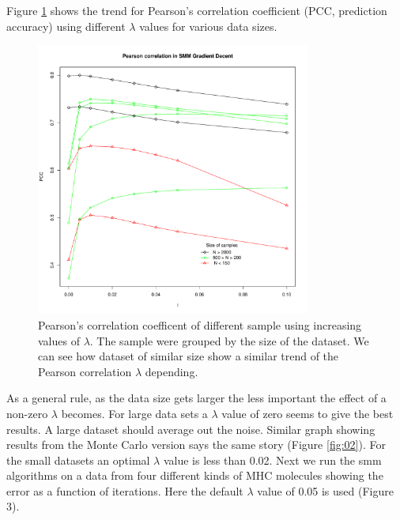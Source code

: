 \documentclass{bioinfo}
\begin{document}
\begin{application}
Figure \ref{fig:01} shows the trend for Pearson's correlation coefficient (PCC, prediction accuracy) using different $\lambda$ values for various data sizes.
\begin{figure}[!tpb]
\centerline{\includegraphics[width=9cm]{fig/smm_l005_ppc_size.pdf}}
\caption{Pearson's correlation coefficent of different sample using increasing values of $\lambda$. The sample were grouped by the size of the dataset. We can see how dataset of similar size show a similar trend of the Pearson correlation $\lambda$ depending.}
\label{fig:01}
\end{figure}
As a general rule, as the data size gets larger the less important the effect of a non-zero $\lambda$ becomes. For large data sets a $\lambda$ value of zero seems to give the best results. A large dataset should average out the noise. Similar graph showing results from the Monte Carlo version says the same story (Figure \ref{fig:02}).
For the small datasets an optimal $\lambda$ value is  less than 0.02. Next we run the smm algorithms on a data from four different kinds of MHC molecules showing the error as a function of iterations. Here the default $\lambda$ value of 0.05 is used (Figure 3).


\end{application}
\end{document}
